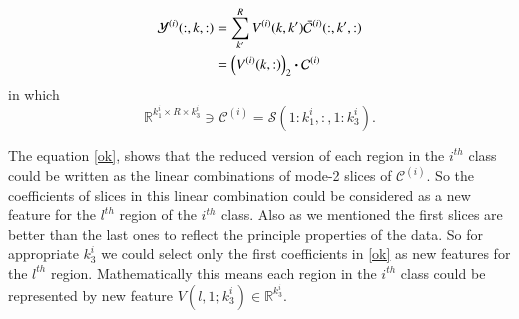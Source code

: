 \documentclass[preprint,12pt]{elsarticle}
\newcommand{\trans}{\mathsf{T}}
\begin{document}
\begin{align}
\label{ok}
{\mathcal{Y}}^{(i)}(:,k,:) &= \sum_{k'}^{R} V^{(i)}(k,k')\bar{\mathcal{C}}^{(i)}(:,k',:) \notag
\\&= \left( V^{(i)}(k,:)\right)_2 \boldsymbol{\cdot} {\mathcal{C}}^{(i)}
\end{align}
in which 
\[
\mathbb{R}^{k_1^i\times R \times k_3^i}\ni {\mathcal{C}}^{(i)} = \mathcal{S}(1:k_1^i,:,1:k_3^i).
\]

The equation \eqref{ok}, shows that the reduced version of each region in the $i^{th}$ class could be
written as the linear combinations of  mode-2 slices of $\mathcal{C}^{(i)}$. So the coefficients of slices in this linear combination could be considered as a new feature for the $l^{th}$ region of the $i^{th}$ class. Also as we mentioned the first slices are better than the last ones to reflect the principle properties of the data. So for appropriate $k_3^i$ we could select only the first coefficients in \eqref{ok} as  new features for the $l^{th}$ region. Mathematically this means each region  in the $i^{th}$ class could be represented by new feature $V(l,1;k_3^i)\in \mathbb{R}^{k_3^i}$.   
\end{document}
